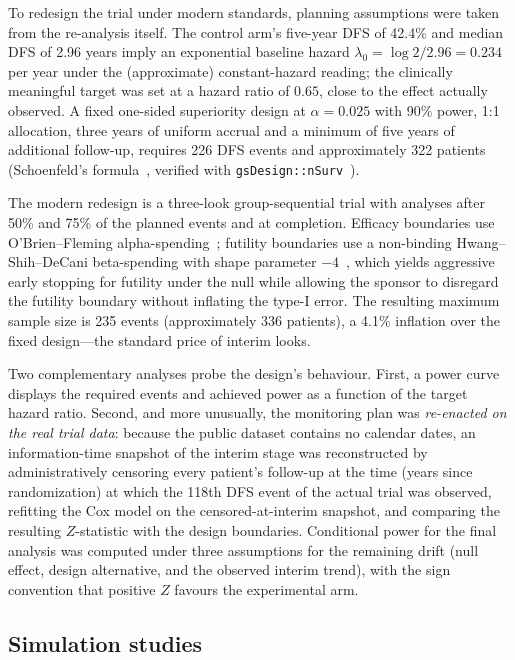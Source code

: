 To redesign the trial under modern standards, planning assumptions were
taken from the re-analysis itself. The control arm's five-year DFS of
42.4\% and median DFS of 2.96 years imply an exponential baseline hazard
$\lambda_0 = \log 2 / 2.96 = 0.234$ per year under the (approximate)
constant-hazard reading; the clinically meaningful target was set at a
hazard ratio of $0.65$, close to the effect actually observed. A fixed
one-sided superiority design at $\alpha = 0.025$ with 90\% power,
1:1 allocation, three years of uniform accrual and a minimum of five
years of additional follow-up, requires 226 DFS events and approximately
322 patients (Schoenfeld's formula~\cite{schoenfeld1983}, verified with
\texttt{gsDesign::nSurv}~\cite{gsdesign2026}).

The modern redesign is a three-look group-sequential trial with analyses
after 50\% and 75\% of the planned events and at completion. Efficacy
boundaries use O'Brien--Fleming alpha-spending~\cite{o1979,lan-demets1983};
futility boundaries use a non-binding Hwang--Shih--DeCani beta-spending
with shape parameter $-4$~\cite{hwang1990}, which yields aggressive
early stopping for futility under the null while allowing the sponsor
to disregard the futility boundary without inflating the type-I error. The resulting
maximum sample size is 235 events (approximately 336 patients), a
4.1\% inflation over the fixed design---the standard price of
interim looks.

Two complementary analyses probe the design's behaviour. First, a power
curve displays the required events and achieved power as a function of
the target hazard ratio. Second, and more unusually, the monitoring plan
was \emph{re-enacted on the real trial data}: because the public dataset
contains no calendar dates, an information-time snapshot of the interim
stage was reconstructed by administratively censoring every patient's
follow-up at the time (years since randomization) at which the 118th
DFS event of the actual trial was observed, refitting the Cox
model on the censored-at-interim snapshot, and comparing the resulting
$Z$-statistic with the design boundaries. Conditional power for the final
analysis was computed under three assumptions for the remaining drift
(null effect, design alternative, and the observed interim trend), with
the sign convention that positive $Z$ favours the experimental arm.

\subsection{Simulation studies}\label{sec:methods-sim}

